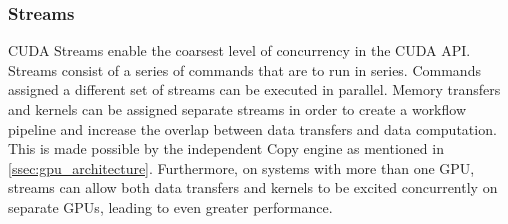 \subsubsection{Streams}\label{sssec:streams}
CUDA Streams enable the coarsest level of concurrency in the CUDA API.  Streams
 consist of a series of commands that are to run in series.  Commands assigned
a different set of streams can be executed in parallel. Memory transfers and
kernels can be assigned separate streams in order to create a workflow pipeline and increase
the overlap between data transfers and data computation. This is made possible by the
independent Copy engine as mentioned in \ref{ssec:gpu_architecture}.  Furthermore,
on systems with more than one \Gls{GPU}, streams can allow both data transfers and
kernels to be excited concurrently on separate \Glspl{GPU}, leading to even greater
performance.
